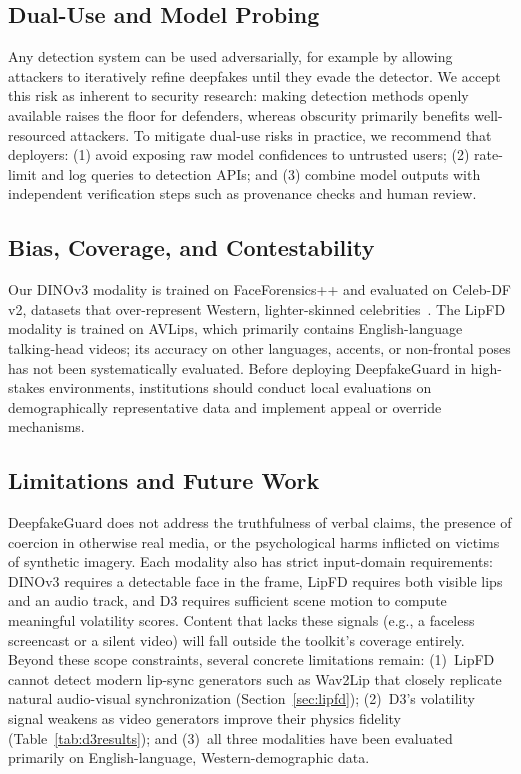 \documentclass[conference]{IEEEtran}
\begin{document}
\subsection{Dual-Use and Model Probing}
Any detection system can be used adversarially, for example by allowing attackers to iteratively refine deepfakes until they evade the detector. We accept this risk as inherent to security research: making detection methods openly available raises the floor for defenders, whereas obscurity primarily benefits well-resourced attackers. To mitigate dual-use risks in practice, we recommend that deployers: (1) avoid exposing raw model confidences to untrusted users; (2) rate-limit and log queries to detection APIs; and (3) combine model outputs with independent verification steps such as provenance checks and human review.

\subsection{Bias, Coverage, and Contestability}
Our DINOv3 modality is trained on FaceForensics++ and evaluated on Celeb-DF v2, datasets that over-represent Western, lighter-skinned celebrities~\cite{rossler2019faceforensics,celebdf}. The LipFD modality is trained on AVLips, which primarily contains English-language talking-head videos; its accuracy on other languages, accents, or non-frontal poses has not been systematically evaluated. Before deploying DeepfakeGuard in high-stakes environments, institutions should conduct local evaluations on demographically representative data and implement appeal or override mechanisms.

\subsection{Limitations and Future Work}
DeepfakeGuard does not address the truthfulness of verbal claims, the presence of coercion in otherwise real media, or the psychological harms inflicted on victims of synthetic imagery. Each modality also has strict input-domain requirements: DINOv3 requires a detectable face in the frame, LipFD requires both visible lips and an audio track, and D3 requires sufficient scene motion to compute meaningful volatility scores. Content that lacks these signals (e.g., a faceless screencast or a silent video) will fall outside the toolkit's coverage entirely. Beyond these scope constraints, several concrete limitations remain: (1)~LipFD cannot detect modern lip-sync generators such as Wav2Lip that closely replicate natural audio-visual synchronization (Section~\ref{sec:lipfd}); (2)~D3's volatility signal weakens as video generators improve their physics fidelity (Table~\ref{tab:d3results}); and (3)~all three modalities have been evaluated primarily on English-language, Western-demographic data.
\end{document}
